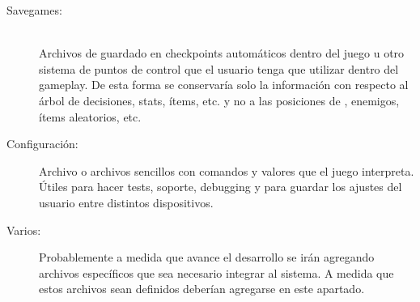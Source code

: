 \begin{description}
\item[Savegames:] \hfill \\Archivos de guardado en checkpoints automáticos dentro del juego u otro sistema de puntos de control que el usuario tenga que utilizar dentro del gameplay. De esta forma se conservaría solo la información con respecto al árbol de decisiones, stats, ítems, etc. y no a las posiciones de , enemigos, ítems aleatorios, etc.

\item[Configuración:] Archivo o archivos sencillos con comandos y valores que el juego interpreta. Útiles para hacer tests, soporte, debugging y para guardar los ajustes del usuario entre distintos dispositivos.

\item[Varios:] Probablemente a medida que avance el desarrollo se irán agregando archivos específicos que sea necesario integrar al sistema. A medida que estos archivos sean definidos deberían agregarse en este apartado.
\end{description}

